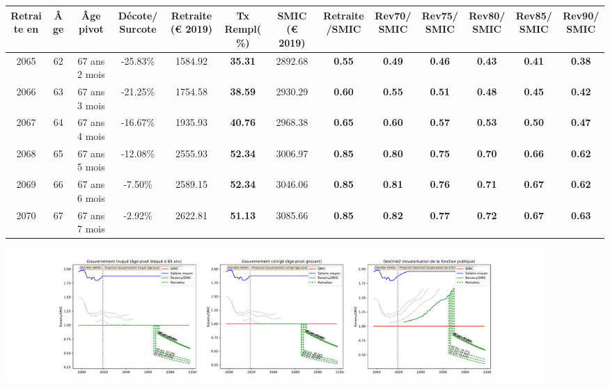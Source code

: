 { \scriptsize \begin{center} 
\begin{tabular}[htb]{|c|c||c|c||c|c||c||c|c|c|c|c|c|} 
\hline 
 Retraite en &  Âge &  Âge pivot &  Décote/Surcote &  Retraite (\euro{} 2019) &  Tx Rempl(\%) &  SMIC (\euro{} 2019) &  Retraite/SMIC &  Rev70/SMIC &  Rev75/SMIC &  Rev80/SMIC &  Rev85/SMIC &  Rev90/SMIC \\ 
\hline \hline 
 2065 &  62 &  67 ans 2 mois &  -25.83\% &  1584.92 &  {\bf 35.31} &  2892.68 &  {\bf {\color{red} 0.55}} &  {\bf {\color{red} 0.49}} &  {\bf {\color{red} 0.46}} &  {\bf {\color{red} 0.43}} &  {\bf {\color{red} 0.41}} &  {\bf {\color{red} 0.38}} \\ 
\hline 
 2066 &  63 &  67 ans 3 mois &  -21.25\% &  1754.58 &  {\bf 38.59} &  2930.29 &  {\bf {\color{red} 0.60}} &  {\bf {\color{red} 0.55}} &  {\bf {\color{red} 0.51}} &  {\bf {\color{red} 0.48}} &  {\bf {\color{red} 0.45}} &  {\bf {\color{red} 0.42}} \\ 
\hline 
 2067 &  64 &  67 ans 4 mois &  -16.67\% &  1935.93 &  {\bf 40.76} &  2968.38 &  {\bf {\color{red} 0.65}} &  {\bf {\color{red} 0.60}} &  {\bf {\color{red} 0.57}} &  {\bf {\color{red} 0.53}} &  {\bf {\color{red} 0.50}} &  {\bf {\color{red} 0.47}} \\ 
\hline 
 2068 &  65 &  67 ans 5 mois &  -12.08\% &  2555.93 &  {\bf 52.34} &  3006.97 &  {\bf {\color{red} 0.85}} &  {\bf {\color{red} 0.80}} &  {\bf {\color{red} 0.75}} &  {\bf {\color{red} 0.70}} &  {\bf {\color{red} 0.66}} &  {\bf {\color{red} 0.62}} \\ 
\hline 
 2069 &  66 &  67 ans 6 mois &  -7.50\% &  2589.15 &  {\bf 52.34} &  3046.06 &  {\bf {\color{red} 0.85}} &  {\bf {\color{red} 0.81}} &  {\bf {\color{red} 0.76}} &  {\bf {\color{red} 0.71}} &  {\bf {\color{red} 0.67}} &  {\bf {\color{red} 0.62}} \\ 
\hline 
 2070 &  67 &  67 ans 7 mois &  -2.92\% &  2622.81 &  {\bf 51.13} &  3085.66 &  {\bf {\color{red} 0.85}} &  {\bf {\color{red} 0.82}} &  {\bf {\color{red} 0.77}} &  {\bf {\color{red} 0.72}} &  {\bf {\color{red} 0.67}} &  {\bf {\color{red} 0.63}} \\ 
\hline 
\hline 
\end{tabular} 
\end{center} } 

 \begin{center}\includegraphics[width=0.9\textwidth]{fig/AdjTech_2003_22_dest_retraite.pdf}\end{center} \label{fig/AdjTech_2003_22_dest_retraite.pdf} 

